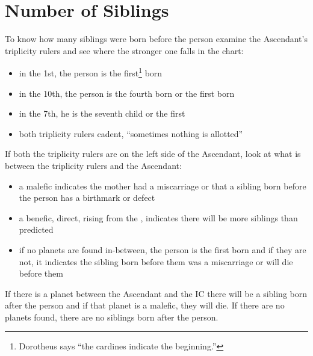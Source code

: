 \section{Number of Siblings}

To know how many siblings were born before the person examine the Ascendant's triplicity rulers and see where the stronger one falls in the chart:
\begin{itemize}[topsep=0em, itemsep=0em]
\item in the 1st, the person is the first\footnote{Dorotheus says ``the cardines indicate the beginning.''} born
\item in the 10th, the person is the fourth born or the first born
\item in the 7th, he is the seventh child or the first
\item both triplicity rulers cadent, ``sometimes nothing is allotted''
\end{itemize}

If both the triplicity rulers are on the left side of the Ascendant, look at what is between the triplicity rulers and the Ascendant:
\begin{itemize}
\item a malefic indicates the mother had a miscarriage or that a sibling born before the person has a birthmark or defect
\item a benefic, direct, rising from the \Sun, indicates there will be more siblings than predicted
\item if no planets are found in-between, the person is the first born and if they are not, it indicates the sibling born before them was a miscarriage or will die before them
\end{itemize}

If there is a planet between the Ascendant and the IC there will be a sibling born after the person and if that planet is a malefic, they will die. If there are no planets found, there are no siblings born after the person.
